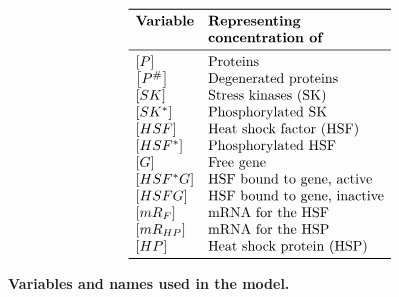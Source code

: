 \documentclass[oneside, 10pt, a4paper, twocolumn]{article}
\begin{document}
%


\begin{table}[h!]
\[\begin{array}{ll}
\toprule
  \text{\textbf{Variable}} & \text{\textbf{Representing }} \\
                  & \text{\textbf{concentration of}} \\
\midrule
 \left[P\right]       & \text{Proteins} \\
 \left[P^\#\right]    & \text{Degenerated proteins} \\
 \left[SK\right]      & \text{Stress kinases (SK)} \\ 
 \left[SK^*\right]    & \text{Phosphorylated SK} \\ 
 \left[HSF\right]     & \text{Heat shock factor (HSF)} \\  
 \left[HSF^*\right]   & \text{Phosphorylated HSF} \\
 \left[G\right]       & \text{Free gene} \\
 \left[HSF^*G\right]  & \text{HSF bound to gene, active} \\
 \left[HSFG\right]    & \text{HSF bound to gene, inactive} \\
 \left[mR_F\right]    & \text{mRNA for the HSF} \\
 \left[mR_{HP}\right] & \text{mRNA for the HSP} \\
 \left[HP\right]      & \text{Heat shock protein (HSP)} \\
\bottomrule
\end{array}\]
\caption{\textbf{Variables and names used in the model.}}\label{TabVars}
\end{table}
\end{document}
